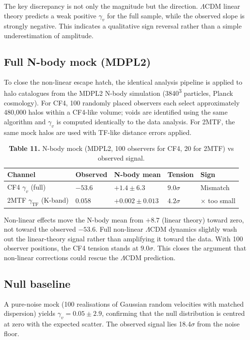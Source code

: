 \documentclass[11pt,a4paper]{article}
\begin{document}
The key discrepancy is not only the magnitude but the direction. \(\Lambda\)CDM linear theory predicts a weak positive \(\gamma_v\) for the full sample, while the observed slope is strongly negative. This indicates a qualitative sign reversal rather than a simple underestimation of amplitude.

\subsection{Full N-body mock (MDPL2)}
To close the non-linear escape hatch, the identical analysis pipeline is applied to halo catalogues from the MDPL2 N-body simulation (3840\textsuperscript{3} particles, Planck cosmology). For CF4, 100 randomly placed observers each select approximately 480,000 halos within a CF4-like volume; voids are identified using the same algorithm and \(\gamma_v\) is computed identically to the data analysis. For 2MTF, the same mock halos are used with TF-like distance errors applied.

\begin{table}[H]
\centering
\footnotesize
\caption{\textbf{Table 11.} N-body mock (MDPL2, 100 observers for CF4, 20 for 2MTF) vs observed signal.}
\begin{tabularx}{\linewidth}{l>{\RaggedRight\arraybackslash}X>{\RaggedRight\arraybackslash}X>{\RaggedRight\arraybackslash}X>{\RaggedRight\arraybackslash}X}
\toprule
\textbf{Channel} & \textbf{Observed} & \textbf{N-body mean} & \textbf{Tension} & \textbf{Sign} \tabularnewline
\midrule
CF4 \(\gamma_v\) (full) & \(-53.6\) & \(+1.4 \pm 6.3\) & \(9.0\sigma\) & Mismatch \tabularnewline
2MTF \(\gamma_\mathrm{TF}\) (K-band) & \(0.058\) & \(+0.002 \pm 0.013\) & \(4.2\sigma\) & 30$\times$ too small \tabularnewline
\bottomrule
\end{tabularx}
\end{table}

Non-linear effects move the N-body mean from \(+8.7\) (linear theory) toward zero, not toward the observed \(-53.6\). Full non-linear \(\Lambda\)CDM dynamics slightly wash out the linear-theory signal rather than amplifying it toward the data. With 100 observer positions, the CF4 tension stands at \(9.0\sigma\). This closes the argument that non-linear corrections could rescue the \(\Lambda\)CDM prediction.

\subsection{Null baseline}
A pure-noise mock (100 realisations of Gaussian random velocities with matched dispersion) yields \(\gamma_v = 0.05 \pm 2.9\), confirming that the null distribution is centred at zero with the expected scatter. The observed signal lies 18.4\(\sigma\) from the noise floor.
\end{document}
